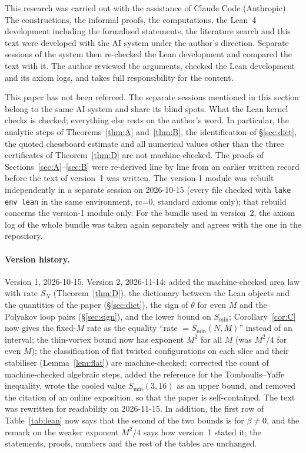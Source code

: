 \documentclass[11pt,a4paper]{article}
\theoremstyle{definition}
\theoremstyle{remark}
\newcommand{\code}[1]{\texttt{#1}}
\begin{document}
This research was carried out with the assistance of Claude Code (Anthropic). The constructions, the informal proofs, the computations, the Lean~4 development including the formalised statements, the literature search and this text were developed with the AI system under the author's direction. Separate sessions of the system then re-checked the Lean development and compared the text with it. The author reviewed the arguments, checked the Lean development and its axiom logs, and takes full responsibility for the content.

This paper has not been refereed. The separate sessions mentioned in this section belong to the same AI system and share its blind spots. What the Lean kernel checks is checked; everything else rests on the author's word. In particular, the analytic steps of Theorems~\ref{thm:A} and~\ref{thm:B}, the identification of \S\ref{sec:dict}, the quoted chessboard estimate and all numerical values other than the three certificates of Theorem~\ref{thm:D} are not machine-checked. The proofs of Sections~\ref{sec:A}--\ref{sec:B} were re-derived line by line from an earlier written record before the text of version~1 was written. The version-1 module was rebuilt independently in a separate session on 2026-10-15 (every file checked with \code{lake env lean} in the same environment, rc=0, standard axioms only); that rebuild concerns the version-1 module only. For the bundle used in version~2, the axiom log of the whole bundle was taken again separately and agrees with the one in the repository.

\paragraph{Version history.}
Version 1, 2026-10-15. Version 2, 2026-11-14: added the machine-checked area law with rate $S_N$ (Theorem~\ref{thm:D}), the dictionary between the Lean objects and the quantities of the paper (\S\ref{sec:dict}), the sign of $\theta$ for even $M$ and the Polyakov loop pairs (\S\ref{sec:sign}), and the lower bound on $S_{\min}$; Corollary~\ref{cor:C} now gives the fixed-$M$ rate as the equality ``rate $=S_{\min}(N,M)$'' instead of an interval; the thin-vortex bound now has exponent $M^2$ for all $M$ (was $M^2/4$ for even $M$); the classification of flat twisted configurations on each slice and their stabiliser (Lemma~\ref{lem:flat}) are machine-checked; corrected the count of machine-checked algebraic steps, added the reference for the Tomboulis--Yaffe inequality, wrote the cooled value $S_{\min}(3,16)$ as an upper bound, and removed the citation of an online exposition, so that the paper is self-contained. The text was rewritten for readability on 2026-11-15. In addition, the first row of Table~\ref{tab:lean} now says that the second of the two bounds is for $\beta\ne0$, and the remark on the weaker exponent $M^2/4$ says how version~1 stated it; the statements, proofs, numbers and the rest of the tables are unchanged.
\end{document}

